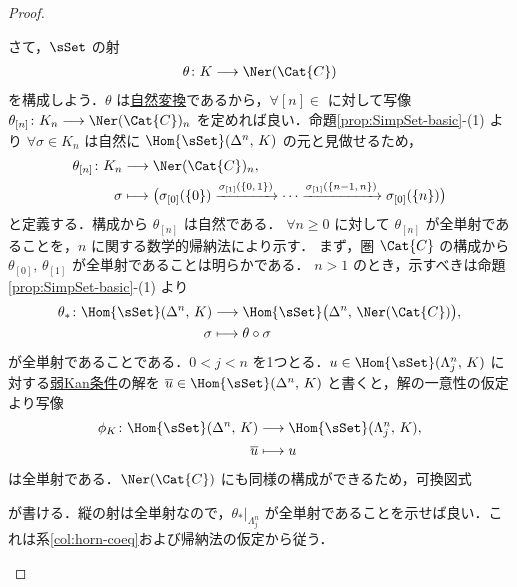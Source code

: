\documentclass[TQFT_main]{subfiles}
\begin{document}
\begin{proof}
\begin{description}
        さて，$\sSet$ の射
        \begin{align}
            \theta \colon K \lto \Ner (\Cat{C})
        \end{align}
        を構成しよう．$\theta$ は\hyperref[def:nat]{自然変換}であるから，$\forall [n] \in $ に対して写像 $\theta_{[n]} \colon K_n \lto \Ner (\Cat{C})_n$ を定めれば良い．命題\ref{prop:SimpSet-basic}-(1) より $\forall \sigma \in K_n$ は自然に $\Hom{\sSet} (\Delta^n,\, K)$ の元と見做せるため，
        \begin{align}
            \theta_{[n]} \colon K_n &\lto \Ner (\Cat{C})_n, \\
            \sigma &\lmto \bigl( \sigma_{[0]}(\{0\}) \xrightarrow{\sigma_{[1]}(\{0,\, 1\})} \cdots \xrightarrow{\sigma_{[1]}(\{n-1,\, n\})} \sigma_{[0]}(\{n\}) \bigr) 
        \end{align}
        と定義する．構成から $\theta_{[n]}$ は自然である．
        $\forall n \ge 0$ に対して $\theta_{[n]}$ が全単射であることを，$n$ に関する数学的帰納法により示す．
        まず，圏 $\Cat{C}$ の構成から $\theta_{[0]},\, \theta_{[1]}$ が全単射であることは明らかである．
        $n > 1$ のとき，示すべきは命題\ref{prop:SimpSet-basic}-(1) より
        \begin{align}
            \theta_* \colon \Hom{\sSet} (\Delta^n,\, K) &\lto \Hom{\sSet} \bigl(\Delta^n,\, \Ner (\Cat{C})\bigr), \\
            \sigma &\lmto \theta \circ \sigma
        \end{align}
        が全単射であることである．$0 < j < n$ を1つとる．$u \in \Hom{\sSet} (\Lambda^n_j,\, K)$ に対する\hyperref[def:KanCplx]{弱Kan条件}の解を $\overline{u} \in \Hom{\sSet} (\Delta^n,\, K)$ と書くと，解の一意性の仮定より写像
        \begin{align}
            \phi_K \colon \Hom{\sSet} (\Delta^n,\, K) &\lto \Hom{\sSet} (\Lambda^n_j,\, K), \\
            \overline{u} &\lmto u
        \end{align}
        は全単射である．$\Ner (\Cat{C})$ にも同様の構成ができるため，可換図式
        \begin{center}
        \end{center}
        が書ける．縦の射は全単射なので，$\theta_*|_{\Lambda^n_j}$ が全単射であることを示せば良い．これは系\ref{col:horn-coeq}および帰納法の仮定から従う．
    \end{description}
    
\end{proof}
\end{document}

